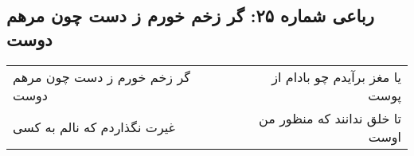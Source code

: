 \begin{center}
\section*{رباعی شماره ۲۵: گر زخم خورم ز دست چون مرهم دوست}
\label{sec:025}
\begin{longtable}{l p{0.5cm} r}
گر زخم خورم ز دست چون مرهم دوست
&&
یا مغز برآیدم چو بادام از پوست
\\
غیرت نگذاردم که نالم به کسی
&&
تا خلق ندانند که منظور من اوست
\\
\end{longtable}
\end{center}
